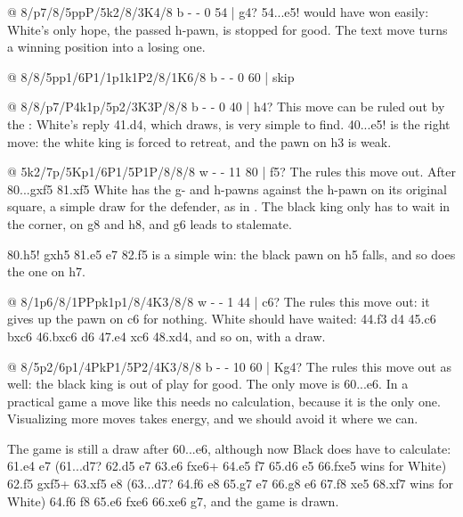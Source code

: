 @ 8/p7/8/5ppP/5k2/8/3K4/8 b - - 0 54 | g4?
54...\K e5! would have won easily: White's only hope, the passed h-pawn, is stopped for good.
The text move turns a winning position into a losing one.

@ 8/8/5pp1/6P1/1p1k1P2/8/1K6/8 b - - 0 60 | skip

@ 8/8/p7/P4k1p/5p2/3K3P/8/8 b - - 0 40 | h4?
This move can be ruled out by the
:
White's reply 41.\K d4, which draws, is very simple to find. 40...\K e5! is the right move: the
white king is forced to retreat, and the pawn on h3 is weak.

@ 5k2/7p/5Kp1/6P1/5P1P/8/8/8 w - - 11 80 | f5?
The  rules this move out.
After 80...gxf5 81.\K xf5 White has the g- and h-pawns against the h-pawn on its original square,
a simple draw for the defender, as in . The black king only has to
wait in the corner, on g8 and h8, and g6 leads to stalemate.

80.h5! gxh5 81.\K e5 \K e7 82.f5 is a simple win: the black pawn on h5 falls, and so does the one
on h7.

@ 8/1p6/8/1PPpk1p1/8/4K3/8/8 w - - 1 44 | c6?
The  rules this move out:
it gives up the pawn on c6 for nothing. White should have waited: 44.\K f3 d4 45.c6 bxc6 46.bxc6
\K d6 47.\K e4 \K xc6 48.\K xd4, and so on, with a draw.

@ 8/5p2/6p1/4PkP1/5P2/4K3/8/8 b - - 10 60 | Kg4?
The  rules this move out as well:
the black king is out of play for good. The only move is 60...\K e6. In a practical game a move
like this needs no calculation, because it is the only one.
Visualizing more moves takes energy, and we should avoid it where we can.

The game is still a draw after 60...\K e6, although now Black does have to calculate:
61.\K e4 \K e7 (61...\K d7? 62.\K d5 \K e7 63.e6 fxe6+ 64.\K e5 \K f7 65.\K d6 e5 66.fxe5
wins for White) 62.f5 gxf5+ 63.\K xf5 \K e8 (63...\K d7? 64.\K f6 \K e8 65.\K g7 \K e7 66.\K g8
\K e6 67.\K f8 \K xe5 68.\K xf7 wins for White) 64.\K f6 \K f8 65.e6 fxe6 66.\K xe6 \K g7, and the
game is drawn.

